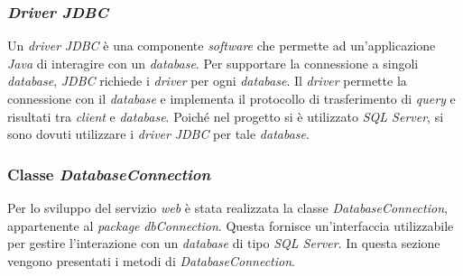 \subsubsection{\textit{Driver JDBC}}

Un \textit{driver} \textit{JDBC} è una componente \textit{software} che permette ad un'applicazione \textit{Java} di interagire con un \textit{database}. Per supportare la connessione a singoli \textit{database}, \textit{JDBC} richiede i \textit{driver} per ogni \textit{database}. Il \textit{driver} permette la connessione con il \textit{database} e implementa il protocollo di trasferimento di \textit{query} e risultati tra \textit{client} e \textit{database}. Poiché nel progetto si è utilizzato \textit{SQL Server}, si sono dovuti utilizzare i \textit{driver} \textit{JDBC} per tale \textit{database}.

\subsubsection{Classe \textit{DatabaseConnection}} \label{dbconnect}

Per lo sviluppo del servizio \textit{web} è stata realizzata la classe \textit{DatabaseConnection}, appartenente al \textit{package} \textit{dbConnection}. Questa fornisce un'interfaccia utilizzabile per gestire l'interazione con un \textit{database} di tipo \textit{SQL Server}. In questa sezione vengono presentati i metodi di \textit{DatabaseConnection}.


